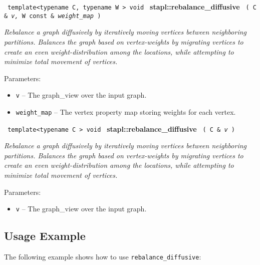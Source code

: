 
\texttt{%
template<typename C, typename W >
\newline
void 
}
\textbf{stapl::rebalance\_diffusive}%
\newline
\texttt{%
(
C \&
\textit{v,}%
W const \&
\textit{weight\_map}%
)     
}
\vspace{0.4cm}

\textit{
Rebalance a graph diffusively by iteratively moving vertices between neighboring partitions.
Balances the graph based on vertex-weights by migrating vertices to create an even weight-distribution among the locations, while attempting to minimize total movement of vertices.
}
\vspace{0.4cm}

Parameters:
\begin{itemize}
\item
\texttt{v} --
The graph\_view over the input graph.
\item
\texttt{weight\_map} --
The vertex property map storing weights for each vertex.
\end{itemize}


\texttt{%
template<typename C >
\newline
void 
}
\textbf{stapl::rebalance\_diffusive}%
\newline
\texttt{%
(
C \&
\textit{v}%
)    
}
\vspace{0.4cm}

\textit{
Rebalance a graph diffusively by iteratively moving vertices between neighboring partitions.
Balances the graph based on vertex-weights by migrating vertices to create an even weight-distribution among the locations, while attempting to minimize total movement of vertices.
}
\vspace{0.4cm}

Parameters:
\begin{itemize}
\item
\texttt{v} --
The graph\_view over the input graph.
\end{itemize}

\subsection{Usage Example} \label{sec-rebal-diff-alg-use}

The following example shows how to use 
\texttt{rebalance\_diffusive}:


